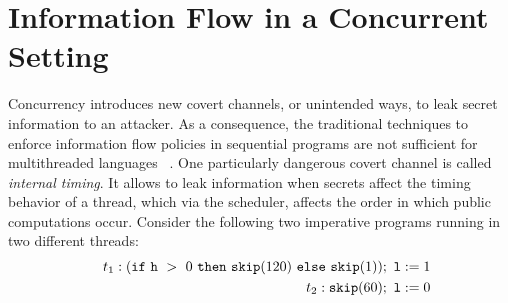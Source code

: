 \documentclass[times, 10pt,twocolumn]{article}
\begin{document}
{%
%


 
\section{Information Flow in a Concurrent Setting}
\label{sec:concurrency}
Concurrency introduces new covert channels, or unintended
ways, to leak secret information to an attacker. As a consequence, 
the traditional techniques to enforce information flow policies in
sequential programs are not sufficient for multithreaded languages
~\cite{Smith:Volpano:MultiThreaded}. One particularly dangerous
covert channel is called \emph{internal timing}. It allows 
to leak information when secrets affect the timing behavior of
a thread, which via the scheduler, affects the order in which public 
computations occur. Consider the following two 
imperative programs running in two different threads:
%
%
{\small{
\begin{eqnarray}
&&
t_1:(\mathtt{if}~\mathtt{h}~>~0~\mathtt{then}~\mathtt{skip}(120)~\mathtt{else}~\mathtt{skip}(1));~\mathtt{l}:=1 
\nonumber \\
&& t_2:\mathtt{skip}(60);~\mathtt{l}:=0 \label{attack:example}
\end{eqnarray}
}}
\vspace{-10pt}

}
\end{document}
